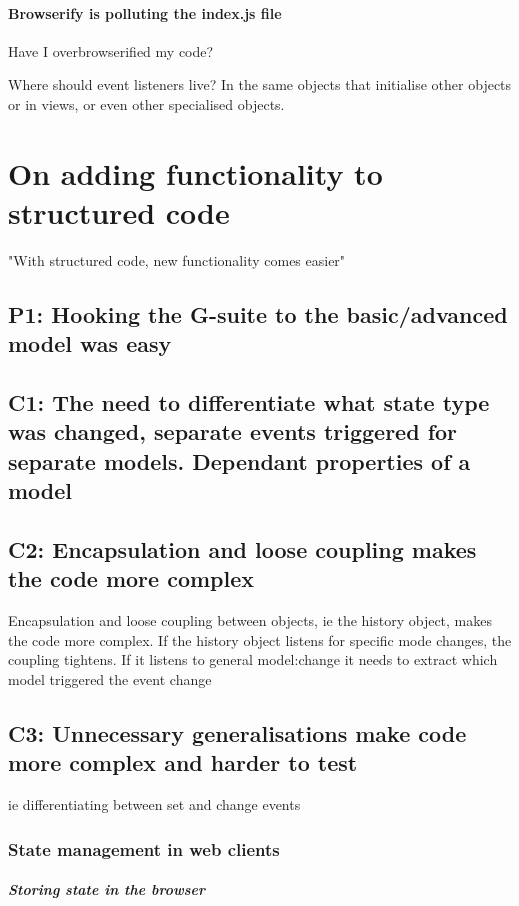 \documentclass[english]{ifimaster}
\begin{document}
\subsubsection{Browserify is polluting the index.js file}
Have I overbrowserified my code?

Where should event listeners live? In the same objects that initialise other objects or in views, or even other specialised objects.

\chapter{On adding functionality to structured code}
"With structured code, new functionality comes easier"
\section{P1: Hooking the G-suite to the basic/advanced model was easy}
\section{C1: The need to differentiate what state type was changed, separate events triggered for separate models. Dependant properties of a model}
\section{C2: Encapsulation and loose coupling makes the code more complex}
Encapsulation and loose coupling between objects, ie the history object, makes the code more complex. If the history object listens for specific mode changes, the coupling tightens. If it listens to general model:change it needs to extract which model triggered the event change
\section{C3: Unnecessary generalisations make code more complex and harder to test}
ie differentiating between set and change events




\subsection{State management in web clients}
\paragraph{Storing state in the browser}
\end{document}
